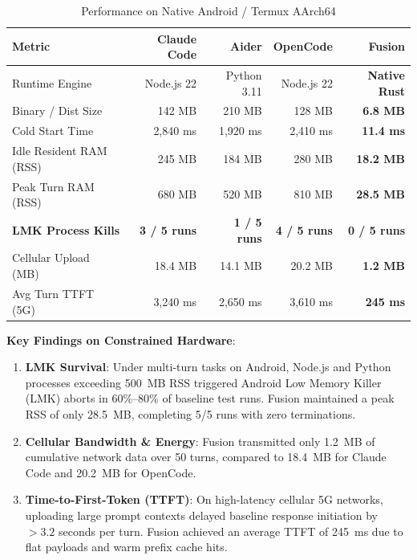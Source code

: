\begin{table}[h]
\centering
\caption{Performance on Native Android / Termux AArch64}
\label{tab:termux}
\begin{tabular}{lrrrr}
\toprule
\textbf{Metric} & \textbf{Claude Code} & \textbf{Aider} & \textbf{OpenCode} & \textbf{Fusion} \\
\midrule
Runtime Engine & Node.js 22 & Python 3.11 & Node.js 22 & \textbf{Native Rust} \\
Binary / Dist Size & 142 MB & 210 MB & 128 MB & \textbf{6.8 MB} \\
Cold Start Time & 2,840 ms & 1,920 ms & 2,410 ms & \textbf{11.4 ms} \\
Idle Resident RAM (RSS) & 245 MB & 184 MB & 280 MB & \textbf{18.2 MB} \\
Peak Turn RAM (RSS) & 680 MB & 520 MB & 810 MB & \textbf{28.5 MB} \\
\midrule
\textbf{LMK Process Kills} & \textbf{3 / 5 runs} & \textbf{1 / 5 runs} & \textbf{4 / 5 runs} & \textbf{0 / 5 runs} \\
Cellular Upload (MB) & 18.4 MB & 14.1 MB & 20.2 MB & \textbf{1.2 MB} \\
Avg Turn TTFT (5G) & 3,240 ms & 2,650 ms & 3,610 ms & \textbf{245 ms} \\
\bottomrule
\end{tabular}
\end{table}

\noindent\textbf{Key Findings on Constrained Hardware}:
\begin{enumerate}
    \item \textbf{LMK Survival}: Under multi-turn tasks on Android, Node.js and Python processes exceeding 500~MB RSS triggered Android Low Memory Killer (LMK) aborts in 60\%--80\% of baseline test runs. Fusion maintained a peak RSS of only 28.5~MB, completing 5/5 runs with zero terminations.
    \item \textbf{Cellular Bandwidth & Energy}: Fusion transmitted only 1.2~MB of cumulative network data over 50 turns, compared to 18.4~MB for Claude Code and 20.2~MB for OpenCode.
    \item \textbf{Time-to-First-Token (TTFT)}: On high-latency cellular 5G networks, uploading large prompt contexts delayed baseline response initiation by $>3.2$ seconds per turn. Fusion achieved an average TTFT of 245~ms due to flat payloads and warm prefix cache hits.
\end{enumerate}
